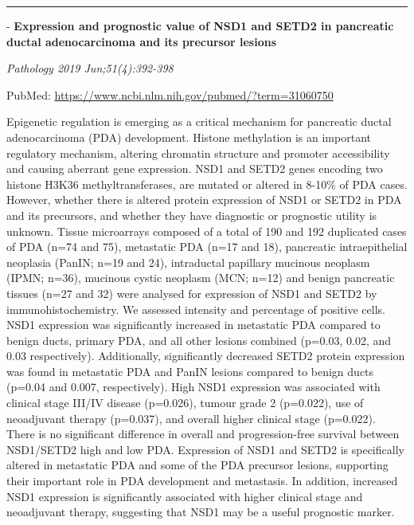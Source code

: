 \documentclass[]{article}
\begin{document}
\begin{center}\rule{0.5\linewidth}{\linethickness}\end{center}

 - \textbf{Expression and prognostic value of NSD1 and SETD2 in
pancreatic ductal adenocarcinoma and its precursor lesions}

\emph{Pathology 2019 Jun;51(4):392-398}

PubMed: \url{https://www.ncbi.nlm.nih.gov/pubmed/?term=31060750}

Epigenetic regulation is emerging as a critical mechanism for pancreatic
ductal adenocarcinoma (PDA) development. Histone methylation is an
important regulatory mechanism, altering chromatin structure and
promoter accessibility and causing aberrant gene expression. NSD1 and
SETD2 genes encoding two histone H3K36 methyltransferases, are mutated
or altered in 8-10\% of PDA cases. However, whether there is altered
protein expression of NSD1 or SETD2 in PDA and its precursors, and
whether they have diagnostic or prognostic utility is unknown. Tissue
microarrays composed of a total of 190 and 192 duplicated cases of PDA
(n=74 and 75), metastatic PDA (n=17 and 18), pancreatic intraepithelial
neoplasia (PanIN; n=19 and 24), intraductal papillary mucinous neoplasm
(IPMN; n=36), mucinous cystic neoplasm (MCN; n=12) and benign pancreatic
tissues (n=27 and 32) were analysed for expression of NSD1 and SETD2 by
immunohistochemistry. We assessed intensity and percentage of positive
cells. NSD1 expression was significantly increased in metastatic PDA
compared to benign ducts, primary PDA, and all other lesions combined
(p=0.03, 0.02, and 0.03 respectively). Additionally, significantly
decreased SETD2 protein expression was found in metastatic PDA and PanIN
lesions compared to benign ducts (p=0.04 and 0.007, respectively). High
NSD1 expression was associated with clinical stage III/IV disease
(p=0.026), tumour grade 2 (p=0.022), use of neoadjuvant therapy
(p=0.037), and overall higher clinical stage (p=0.022). There is no
significant difference in overall and progression-free survival between
NSD1/SETD2 high and low PDA. Expression of NSD1 and SETD2 is
specifically altered in metastatic PDA and some of the PDA precursor
lesions, supporting their important role in PDA development and
metastasis. In addition, increased NSD1 expression is significantly
associated with higher clinical stage and neoadjuvant therapy,
suggesting that NSD1 may be a useful prognostic marker.

{}
\end{document}
